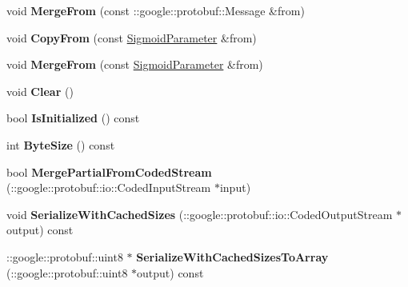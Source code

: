\begin{DoxyCompactItemize}
void {\bfseries Merge\+From} (const \+::google\+::protobuf\+::\+Message \&from)
\item 
\mbox{\label{classcaffe_1_1_sigmoid_parameter_aae51431dc6d1c145f9da03add47da4f8}} 
void {\bfseries Copy\+From} (const \mbox{\hyperlink{classcaffe_1_1_sigmoid_parameter}{Sigmoid\+Parameter}} \&from)
\item 
\mbox{\label{classcaffe_1_1_sigmoid_parameter_a19a1d79ba759ca257aed4e19dd835253}} 
void {\bfseries Merge\+From} (const \mbox{\hyperlink{classcaffe_1_1_sigmoid_parameter}{Sigmoid\+Parameter}} \&from)
\item 
\mbox{\label{classcaffe_1_1_sigmoid_parameter_af24dbe6d1d7fa082cef36b043211e64f}} 
void {\bfseries Clear} ()
\item 
\mbox{\label{classcaffe_1_1_sigmoid_parameter_a14116ae55e9392bc6dc7f9f1c28fb831}} 
bool {\bfseries Is\+Initialized} () const
\item 
\mbox{\label{classcaffe_1_1_sigmoid_parameter_ac1d018158c82fcceedd8e481adc7a54a}} 
int {\bfseries Byte\+Size} () const
\item 
\mbox{\label{classcaffe_1_1_sigmoid_parameter_a3b769818a6f9cd2378d40ba65a9fc220}} 
bool {\bfseries Merge\+Partial\+From\+Coded\+Stream} (\+::google\+::protobuf\+::io\+::\+Coded\+Input\+Stream $\ast$input)
\item 
\mbox{\label{classcaffe_1_1_sigmoid_parameter_a969b53b835eb34a737555d74f26e7440}} 
void {\bfseries Serialize\+With\+Cached\+Sizes} (\+::google\+::protobuf\+::io\+::\+Coded\+Output\+Stream $\ast$output) const
\item 
\mbox{\label{classcaffe_1_1_sigmoid_parameter_ab9b2b688e830bd5a994e1c77067301c2}} 
\+::google\+::protobuf\+::uint8 $\ast$ {\bfseries Serialize\+With\+Cached\+Sizes\+To\+Array} (\+::google\+::protobuf\+::uint8 $\ast$output) const
\item 
\mbox{\label{classcaffe_1_1_sigmoid_parameter_a3689522317b24b6951310d838966d82e}} 

\end{DoxyCompactItemize}
